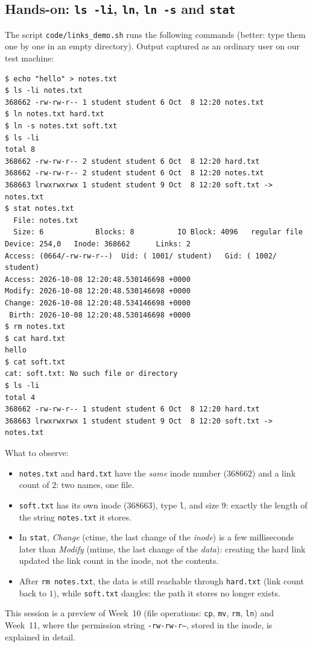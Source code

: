 \documentclass[11pt,a4paper]{article}
\newcommand{\cmd}[1]{\texttt{#1}}
\begin{document}
\subsection{Hands-on: \texttt{ls -li}, \texttt{ln}, \texttt{ln -s} and \texttt{stat}}
\label{sec:links}

The script \cmd{code/links\_demo.sh} runs the following commands (better: type them one by one in an empty directory). Output captured as an ordinary user on our test machine:

\begin{lstlisting}[style=term]
$ echo "hello" > notes.txt
$ ls -li notes.txt
368662 -rw-rw-r-- 1 student student 6 Oct  8 12:20 notes.txt
$ ln notes.txt hard.txt
$ ln -s notes.txt soft.txt
$ ls -li
total 8
368662 -rw-rw-r-- 2 student student 6 Oct  8 12:20 hard.txt
368662 -rw-rw-r-- 2 student student 6 Oct  8 12:20 notes.txt
368663 lrwxrwxrwx 1 student student 9 Oct  8 12:20 soft.txt -> notes.txt
$ stat notes.txt
  File: notes.txt
  Size: 6            Blocks: 8          IO Block: 4096   regular file
Device: 254,0   Inode: 368662      Links: 2
Access: (0664/-rw-rw-r--)  Uid: ( 1001/ student)   Gid: ( 1002/ student)
Access: 2026-10-08 12:20:48.530146698 +0000
Modify: 2026-10-08 12:20:48.530146698 +0000
Change: 2026-10-08 12:20:48.534146698 +0000
 Birth: 2026-10-08 12:20:48.530146698 +0000
$ rm notes.txt
$ cat hard.txt
hello
$ cat soft.txt
cat: soft.txt: No such file or directory
$ ls -li
total 4
368662 -rw-rw-r-- 1 student student 6 Oct  8 12:20 hard.txt
368663 lrwxrwxrwx 1 student student 9 Oct  8 12:20 soft.txt -> notes.txt
\end{lstlisting}

What to observe:
\begin{itemize}
  \item \texttt{notes.txt} and \texttt{hard.txt} have the \emph{same} inode number ($368662$) and a link count of $2$: two names, one file.
  \item \texttt{soft.txt} has its own inode ($368663$), type \texttt{l}, and size $9$: exactly the length of the string \texttt{notes.txt} it stores.
  \item In \cmd{stat}, \emph{Change} (ctime, the last change of the \emph{inode}) is a few milliseconds later than \emph{Modify} (mtime, the last change of the \emph{data}): creating the hard link updated the link count in the inode, not the contents.
  \item After \cmd{rm notes.txt}, the data is still reachable through \texttt{hard.txt} (link count back to $1$), while \texttt{soft.txt} dangles: the path it stores no longer exists.
\end{itemize}
This session is a preview of Week~10 (file operations: \cmd{cp}, \cmd{mv}, \cmd{rm}, \cmd{ln}) and Week~11, where the permission string \texttt{-rw-rw-r--}, stored in the inode, is explained in detail.
\end{document}
